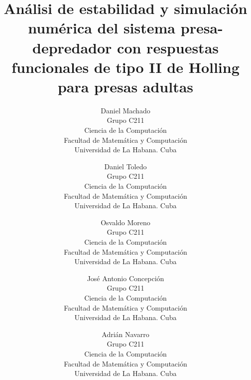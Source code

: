 \documentclass{wscpaperproc}
\theoremstyle{wsc}
\begin{document}

\title{An\'alisi de estabilidad y simulaci\'on num\'erica del sistema presa-depredador con respuestas funcionales de tipo II de Holling para presas adultas}

\author{
	Daniel Machado \\[12pt]
	Grupo C211\\
	Ciencia de la Computaci\'on\\
	Facultad de Matem\'atica y Computaci\'on\\
	Universidad de La Habana. Cuba\\
	\and
	Daniel Toledo\\[12pt]
	Grupo C211\\
	Ciencia de la Computaci\'on\\
	Facultad de Matem\'atica y Computaci\'on\\
	Universidad de La Habana. Cuba\\
	\and
	Osvaldo Moreno\\[12pt]
	Grupo C211\\
	Ciencia de la Computaci\'on\\
	Facultad de Matem\'atica y Computaci\'on\\
	Universidad de La Habana. Cuba\\
	\and
	Jos\'e Antonio Concepci\'on\\[12pt]
	Grupo C211\\
	Ciencia de la Computaci\'on\\
	Facultad de Matem\'atica y Computaci\'on\\
	Universidad de La Habana. Cuba\\
	\and
	Adri\'an Navarro\\[12pt]
	Grupo C211\\
	Ciencia de la Computaci\'on\\
	Facultad de Matem\'atica y Computaci\'on\\
	Universidad de La Habana. Cuba\\
}



\maketitle
\end{document}
